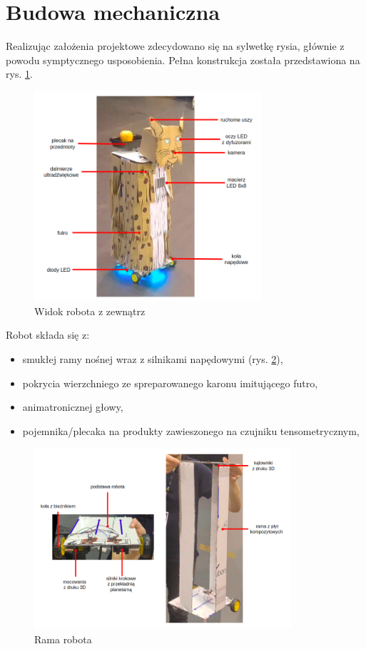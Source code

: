 \documentclass{article}
\begin{document}
    \section{Budowa mechaniczna}
        Realizując założenia projektowe zdecydowano się na sylwetkę rysia, głównie z powodu symptycznego usposobienia.
        Pełna konstrukcja została przedstawiona na rys. \ref{full_opisy}.
        \begin{figure}[p]
            \centering
            \includegraphics[width=0.75\textwidth]{figures/full_opisy.png}
            \caption{Widok robota z zewnątrz}
            \label{full_opisy}
        \end{figure}
        Robot składa się z:
        \begin{itemize}
            \item smukłej ramy nośnej wraz z silnikami napędowymi (rys. \ref{frame_opisy}),
            \item pokrycia wierzchniego ze spreparowanego karonu imitującego futro,
            \item animatronicznej głowy,
            \item pojemnika/plecaka na produkty zawieszonego na czujniku tensometrycznym,
        \end{itemize}
        \begin{figure}[p]
            \centering
            \includegraphics[width=0.85\textwidth]{figures/frame_opisy.png}
            \caption{Rama robota}
            \label{frame_opisy}
        \end{figure}
\end{document}
